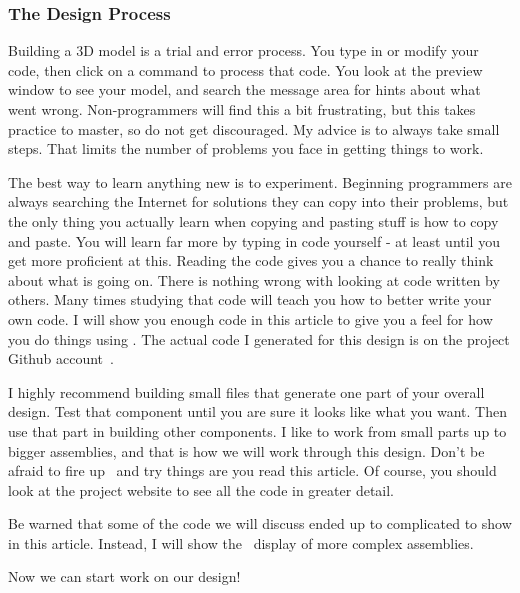\subsubsection{The Design Process}

Building a 3D model is a trial and error process. You type in or modify your
code, then click on a command to process that code. You look at the preview
window to see your model, and search the message area for hints about what went
wrong.  Non-programmers will find this a bit frustrating, but this takes
practice to master, so do not get discouraged. My advice is to always take
small steps.  That limits the number of problems you face in getting things to
work.

The best way to learn anything new is to experiment. Beginning programmers are
always searching the Internet for solutions they can copy into their problems,
but the only thing you actually learn when copying and pasting stuff is how to
copy and paste. You will learn far more by typing in code yourself - at least
until you get more proficient at this. Reading the code gives you a chance to
really think about what is going on. There is nothing wrong with looking at
code written by others. Many times studying that code will teach you how to
better write your own code. I will show you enough code in this article to give
you a feel for how you do things using \osc. The actual code I generated for
this design is on the project Github account~\cite{blackr}.

I highly recommend building small files that generate one part of your overall
design. Test that component until you are sure it looks like what you want.
Then use that part in building other components. I like to work from small
parts up to bigger assemblies, and that is how we will work through this
design. Don't be afraid to fire up \osc\ and try things are you read this
article. Of course, you should look at the project website to see all the code
in greater detail.

Be warned that some of the code we will discuss ended up to complicated to show
in this article. Instead, I will show the \osc\ display of more complex assemblies.

Now we can start work on our design!

